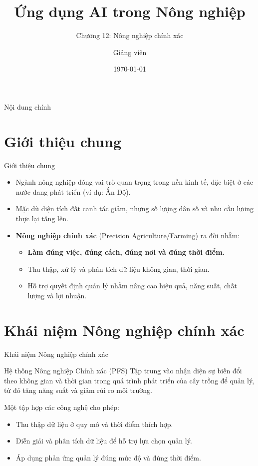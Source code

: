 \documentclass[aspectratio=169]{beamer}
\title[AI trong NN]{Ứng dụng AI trong Nông nghiệp}
\subtitle{Chương 12: Nông nghiệp chính xác}
\author{Giảng viên}
\institute{Đại học Đông Á}
\date{\today}
\begin{document}
\begin{frame}
    \titlepage
\end{frame}

\begin{frame}{Nội dung chính}
    \tableofcontents
\end{frame}

\section{Giới thiệu chung}
\begin{frame}{Giới thiệu chung}
    \begin{itemize}
        \item Ngành nông nghiệp đóng vai trò quan trọng trong nền kinh tế, đặc biệt ở các nước đang phát triển (ví dụ: Ấn Độ).
        \item Mặc dù diện tích đất canh tác giảm, nhưng số lượng dân số và nhu cầu lương thực lại tăng lên.
        \item \textbf{Nông nghiệp chính xác} (Precision Agriculture/Farming) ra đời nhằm:
        \begin{itemize}
            \item \textbf{Làm đúng việc, đúng cách, đúng nơi và đúng thời điểm.}
            \item Thu thập, xử lý và phân tích dữ liệu không gian, thời gian.
            \item Hỗ trợ quyết định quản lý nhằm nâng cao hiệu quả, năng suất, chất lượng và lợi nhuận.
        \end{itemize}
    \end{itemize}
\end{frame}

\section{Khái niệm Nông nghiệp chính xác}
\begin{frame}{Khái niệm Nông nghiệp chính xác}
    \begin{block}{Hệ thống Nông nghiệp Chính xác (PFS)}
        Tập trung vào nhận diện sự biến đổi theo không gian và thời gian trong quá trình phát triển của cây trồng để quản lý, từ đó tăng năng suất và giảm rủi ro môi trường.
    \end{block}
    
    \vspace{0.3cm}
    Một tập hợp các công nghệ cho phép:
    \begin{itemize}
        \item Thu thập dữ liệu ở quy mô và thời điểm thích hợp.
        \item Diễn giải và phân tích dữ liệu để hỗ trợ lựa chọn quản lý.
        \item Áp dụng phản ứng quản lý đúng mức độ và đúng thời điểm.
    \end{itemize}
\end{frame}
\end{document}
